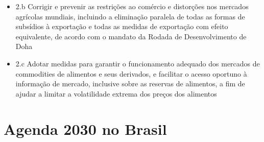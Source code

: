 \begin{itemize}
\item 2.b Corrigir e prevenir as restrições ao comércio e distorções nos mercados agrícolas mundiais, incluindo a eliminação paralela de todas as formas de subsídios à exportação e todas as medidas de exportação com efeito equivalente, de acordo com o mandato da Rodada de Desenvolvimento de Doha 
\item 2.c Adotar medidas para garantir o funcionamento adequado dos mercados de commodities de alimentos e seus derivados, e facilitar o acesso oportuno à informação de mercado, inclusive sobre as reservas de alimentos, a fim de ajudar a limitar a volatilidade extrema dos preços dos alimentos
\end{itemize}
\chapter{Agenda 2030 no Brasil}
